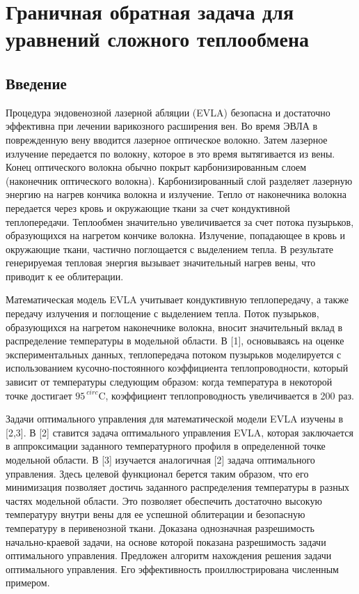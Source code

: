 \section{Граничная обратная задача для уравнений сложного теплообмена}

\subsection{Введение}
Процедура эндовенозной лазерной абляции (EVLA) безопасна и достаточно эффективна при
лечении варикозного расширения вен.
Во время ЭВЛА в поврежденную вену вводится лазерное оптическое волокно.
Затем лазерное излучение передается по волокну, которое в это время вытягивается из вены.
Конец оптического волокна обычно покрыт карбонизированным слоем (наконечник оптического волокна).
Карбонизированный слой разделяет лазерную энергию на нагрев кончика волокна и излучение.
Тепло от наконечника волокна передается через кровь и окружающие ткани за счет кондуктивной теплопередачи.
Теплообмен значительно увеличивается за счет потока пузырьков, образующихся на нагретом кончике волокна.
Излучение, попадающее в кровь и окружающие ткани, частично поглощается с выделением тепла.
В результате генерируемая тепловая энергия вызывает значительный нагрев вены, что приводит к ее облитерации.


Математическая модель EVLA учитывает кондуктивную теплопередачу, а также передачу излучения
и поглощение с выделением тепла.
Поток пузырьков, образующихся на нагретом наконечнике волокна,
вносит значительный вклад в распределение температуры в модельной области.
В [1], основываясь на оценке экспериментальных данных, теплопередача потоком пузырьков моделируется
с использованием кусочно-постоянного коэффициента теплопроводности, который зависит от температуры
следующим образом: когда температура в некоторой точке достигает $95 ^ {\ circ} \mathrm {C}$,
коэффициент теплопроводность увеличивается в 200 раз.


Задачи оптимального управления для математической модели EVLA изучены в [2,3].
В [2] ставится задача оптимального управления EVLA, которая заключается в
аппроксимации заданного температурного профиля в определенной точке модельной области.
В [3] изучается аналогичная [2] задача оптимального управления.
Здесь целевой функционал берется таким образом, что его минимизация позволяет достичь
заданного распределения температуры в разных частях модельной области.
Это позволяет обеспечить достаточно высокую температуру внутри вены для ее успешной
облитерации и безопасную температуру в перивенозной ткани.
Доказана однозначная разрешимость начально-краевой задачи,
на основе которой показана разрешимость задачи оптимального управления.
Предложен алгоритм нахождения решения задачи оптимального управления.
Его эффективность проиллюстрирована численным примером.


